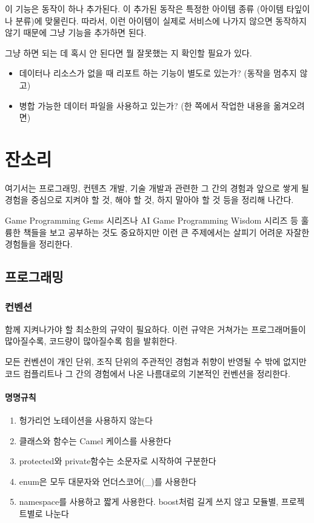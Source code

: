\documentclass[chapter,kosection, 10.5pt, romanfixed, a4paper]{oblivoir}
\begin{document}
이 기능은 동작이 하나 추가된다. 이 추가된 동작은 특정한 아이템 종류 (아이템 타잎이나 분류)에 
맞물린다. 따라서, 이런 아이템이 실제로 서비스에 나가지 않으면 동작하지 않기 때문에 
그냥 기능을 추가하면 된다. 

그냥 하면 되는 데 혹시 안 된다면 뭘 잘못했는 지 확인할 필요가 있다. 

\begin{itemize}
\item 데이터나 리소스가 없을 때 리포트 하는 기능이 별도로 있는가? (동작을 멈추지 않고)
\item 병합 가능한 데이터 파일을 사용하고 있는가? (한 쪽에서 작업한 내용을 옮겨오려면)
\end{itemize}

\chapter{잔소리}

여기서는 프로그래밍, 컨텐츠 개발, 기술 개발과 관련한 그 간의 경험과 앞으로 쌓게 될 경험을
중심으로 지켜야 할 것, 해야 할 것, 하지 말아야 할 것 등을 정리해 나간다. 

Game Programming Gems 시리즈나 AI Game Programming Wisdom 시리즈 등 훌륭한 책들을 보고 
공부하는 것도 중요하지만 이런 큰 주제에서는 살피기 어려운 자잘한 경험들을 정리한다. 

\section{프로그래밍}

\subsection{컨벤션}

함께 지켜나가야 할 최소한의 규약이 필요하다. 이런 규약은 거쳐가는 프로그래머들이 많아질수록, 
코드량이 많아질수록 힘을 발휘한다. 

모든 컨벤션이 개인 단위, 조직 단위의 주관적인 경험과 취향이 반영될 수 밖에 없지만 
코드 컴플리트나 그 간의 경험에서 나온 나름대로의 기본적인 컨벤션을 정리한다. 

\subsubsection{명명규칙}

\begin{enumerate}
\item 헝가리언 노테이션을 사용하지 않는다
\item 클래스와 함수는 Camel 케이스를 사용한다
\item protected와 private함수는 소문자로 시작하여 구분한다
\item enum은 모두 대문자와 언더스코어(\_)를 사용한다
\item namespace를 사용하고 짧게 사용한다. boost처럼 길게 쓰지 않고 모듈별, 프로젝트별로 나눈다
\end{enumerate}
\end{document}

